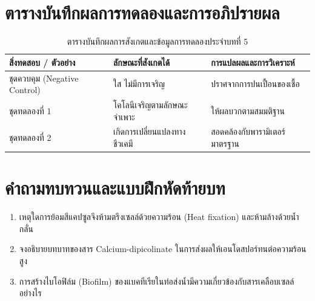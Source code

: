 \section{ตารางบันทึกผลการทดลองและการอภิปรายผล}
\begin{table}[H]
\centering\small
\caption{ตารางบันทึกผลการสังเกตและข้อมูลการทดลองประจำบทที่ 5}
\label{tab:ch05_datasheet}
\begin{tabularx}{\textwidth}{p{} p{} X}
\toprule
\textbf{สิ่งทดสอบ / ตัวอย่าง} & \textbf{ลักษณะที่สังเกตได้} & \textbf{การแปลผลและการวิเคราะห์} \\
\midrule
ชุดควบคุม (Negative Control) & ใส ไม่มีการเจริญ & ปราศจากการปนเปื้อนของเชื้อ \\
ชุดทดลองที่ 1 & โคโลนีเจริญตามลักษณะจำเพาะ & ให้ผลบวกตามสมมติฐาน \\
ชุดทดลองที่ 2 & เกิดการเปลี่ยนแปลงทางชีวเคมี & สอดคล้องกับพารามิเตอร์มาตรฐาน \\
\bottomrule
\end{tabularx}
\end{table}

\section{คำถามทบทวนและแบบฝึกหัดท้ายบท}
\begin{enumerate}
    \item เหตุใดการย้อมสีแคปซูลจึงห้ามตรึงเซลล์ด้วยความร้อน (Heat fixation) และห้ามล้างด้วยน้ำกลั่น
    \item จงอธิบายบทบาทของสาร Calcium-dipicolinate ในการส่งผลให้เอนโดสปอร์ทนต่อความร้อนสูง
    \item การสร้างไบโอฟิล์ม (Biofilm) ของแบคทีเรียในท่อส่งน้ำมีความเกี่ยวข้องกับสารเคลือบเซลล์อย่างไร
\end{enumerate}
